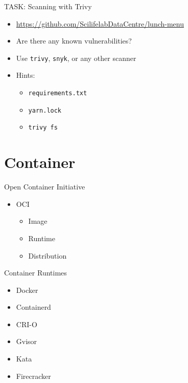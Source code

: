 \documentclass{dcpresentation}
\begin{document}
\begin{frame}{TASK: Scanning with Trivy}
  \begin{itemize}
  \item \url{https://github.com/ScilifelabDataCentre/lunch-menu}
  \item Are there any known vulnerabilities?
  \item Use \texttt{trivy}, \texttt{snyk}, or any other scanner
  \item Hints:
    \begin{itemize}
    \item \texttt{requirements.txt}
    \item \texttt{yarn.lock}
    \item \texttt{trivy fs}
    \end{itemize}
  \end{itemize}
\end{frame}

\section{Container}

\begin{frame}
\end{frame}


\begin{frame}{Open Container Initiative}
  \begin{itemize}
  \item OCI
    \begin{itemize}
    \item Image
    \item Runtime
    \item Distribution
    \end{itemize}
  \end{itemize}
\end{frame}

\begin{frame}{Container Runtimes}
  \begin{itemize}
  \item Docker
  \item Containerd
  \item CRI-O
  \item Gvisor
  \item Kata
  \item Firecracker
  \end{itemize}
\end{frame}
\end{document}
